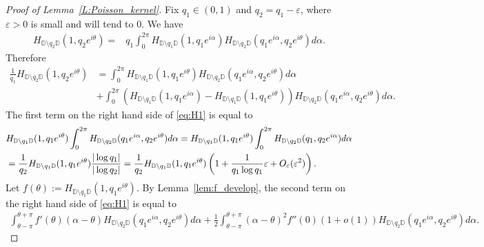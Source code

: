 \documentclass[11pt]{article}
\theoremstyle{remark}
\newcommand{\eps}{\varepsilon}
\numberwithin{equation}{section}
\begin{document}
\begin{proof}[Proof of Lemma~\ref{L:Poisson_kernel}]
Fix $q_1 \in(0,1)$ and $q_2=q_1 -\eps$, where $\eps>0$ is small and will tend to $0$. We have
\begin{align*}
H_{{\mathbb{D}}\setminus q_2 {\mathbb{D}}} (1, q_2 e^{i\theta}) = &q_1 \int_0^{2\pi} H_{{\mathbb{D}}\setminus q_1 {\mathbb{D}}} (1, q_1 e^{i\alpha}) H_{{\mathbb{D}}\setminus q_2 {\mathbb{D}}} (q_1 e^{i\alpha}, q_2 e^{i\theta}) d \alpha.
\end{align*}
Therefore 
\begin{align}
\label{eq:H1}
\frac{1}{q_1}H_{{\mathbb{D}}\setminus q_2 {\mathbb{D}}} (1, q_2 e^{i\theta})
& =  \int_0^{2\pi} H_{{\mathbb{D}}\setminus q_1 {\mathbb{D}}} (1, q_1 e^{i\theta}) H_{{\mathbb{D}}\setminus q_2 {\mathbb{D}}} (q_1 e^{i\alpha}, q_2 e^{i\theta}) d \alpha \\
& + \int_0^{2\pi} ( H_{{\mathbb{D}}\setminus q_1 {\mathbb{D}}} (1, q_1 e^{i\alpha})  -H_{{\mathbb{D}}\setminus q_1 {\mathbb{D}}} (1, q_1 e^{i\theta}) ) H_{{\mathbb{D}}\setminus q_2 {\mathbb{D}}} (q_1 e^{i\alpha}, q_2 e^{i\theta}) d \alpha.
\nonumber
\end{align}
The first term on the right hand side of \eqref{eq:H1} is equal to
\begin{align}
\notag
& H_{{\mathbb{D}}\setminus q_1 {\mathbb{D}}} (1, q_1 e^{i\theta}) \int_0^{2\pi}  H_{{\mathbb{D}}\setminus q_2 {\mathbb{D}}} (q_1 e^{i\alpha}, q_2 e^{i\theta}) d \alpha =  H_{{\mathbb{D}}\setminus q_1 {\mathbb{D}}} (1, q_1 e^{i\theta}) \int_0^{2\pi}  H_{{\mathbb{D}}\setminus q_2 {\mathbb{D}}} (q_1, q_2 e^{i\alpha}) d \alpha \\
\label{eq:H3}
&=\frac{1}{q_2} H_{{\mathbb{D}}\setminus q_1 {\mathbb{D}}} (1, q_1 e^{i\theta}) \frac{|\log q_1|}{|\log q_2|} = \frac{1}{q_2} H_{{\mathbb{D}}\setminus q_1 {\mathbb{D}}} (1, q_1 e^{i\theta}) \left(1 + \frac{1}{q_1 \log q_1} \eps + O_\eps(\eps^2) \right).
\end{align}
Let $f(\theta):=H_{{\mathbb{D}}\setminus q_1 {\mathbb{D}}} (1, q_1 e^{i\theta})$. 
By Lemma~\ref{lem:f_develop}, the second term on the right hand side of \eqref{eq:H1} is equal to
\begin{align*}
 \int_{\theta-\pi}^{\theta+\pi} f'(\theta)(\alpha -\theta) H_{{\mathbb{D}}\setminus q_2 {\mathbb{D}}} (q_1 e^{i\alpha}, q_2 e^{i\theta}) d \alpha +\frac12  \int_{\theta-\pi}^{\theta+\pi} (\alpha-\theta)^2 f''(0) (1+o(1)) H_{{\mathbb{D}}\setminus q_2 {\mathbb{D}}} (q_1 e^{i\alpha}, q_2 e^{i\theta}) d \alpha.
\end{align*}

\end{proof}
\end{document}
